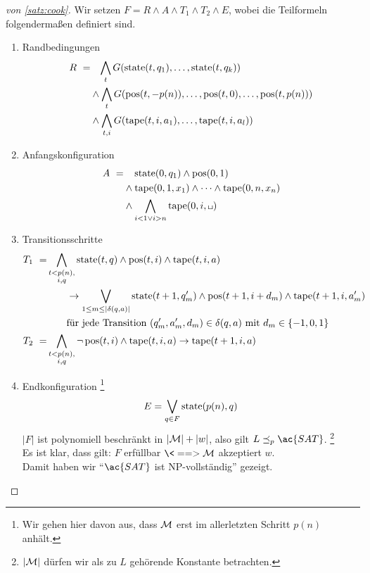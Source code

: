 \begin{proof}[von \autoref{satz:cook}]
	Wir setzen $F = R \land A\land T_1 \land T_2 \land E$, wobei die Teilformeln folgendermaßen definiert sind.
	\begin{enumerate}
	\item Randbedingungen
		\begin{align*}
			R\ =&\phantom{\land}\, \bigwedge_t G(\operatorname{state}(t,q_1),\dots,\operatorname{state}(t,q_k))\\
			& \land \bigwedge_t G(\operatorname{pos}(t,-p(n)),\dots,\operatorname{pos}(t,0),\dots,\operatorname{pos}(t,p(n)))\\
			& \land \bigwedge_{t,i} G(\operatorname{tape}(t,i,a_1),\dots,\operatorname{tape}(t,i,a_l))
		\end{align*}
	\item Anfangskonfiguration
		\begin{align*}
			A\ =&\phantom{\land}\; \state(0,q_1)\land \pos(0,1)\\
			&\land\tape(0,1,x_1)\land\dots\land\tape(0,n,x_n)\\
			&\land\bigwedge_{i< 1 \lor i > n} \tape(0,i,\blank)
		\end{align*}
	\item Transitionsschritte
	\begin{align*}
		T_1\ =& \bigwedge_{\substack{t < p(n),\\i,q}} \state(t,q)\land \pos(t,i) \land \tape(t,i,a)\\
		&\qquad \-> \bigvee_{1 \leq m \leq |\delta(q,a)|} \state(t+1,q_m')\land \pos(t+1,i+d_m) \land \tape(t+1,i,a_m')\\
		&\qquad \text{für jede Transition } (q_m',a_m',d_m) \in \delta(q,a) \text{ mit } d_m\in\{-1,0,1\}\\
		T_2\ =& \bigwedge_{\substack{t < p(n),\\i,q}} \neg \pos(t,i)\land \tape(t,i,a) \-> \tape(t+1,i,a)
	\end{align*}
	\item Endkonfiguration%
	\footnote{Wir gehen hier davon aus, dass $\mathcal{M}$ erst im allerletzten Schritt $p(n)$ anhält.}
		\[ E = \bigvee_{q\in F} \operatorname{state}(p(n),q) \]
		$|F|$ ist polynomiell beschränkt in $|\mathcal{M}|+|w|$, also gilt $L\preceq_p \ac{SAT}$.%
		\footnote{$|\mathcal{M}|$ dürfen wir als zu $L$ gehörende Konstante betrachten.}\\
		Es ist klar, dass gilt: $F$ erfüllbar $\<==> \M$ akzeptiert $w$.\\
		Damit haben wir "`$\ac{SAT}$ ist \ac{NP}-vollständig"' gezeigt.
		\qedhere
	\end{enumerate}
\end{proof}











